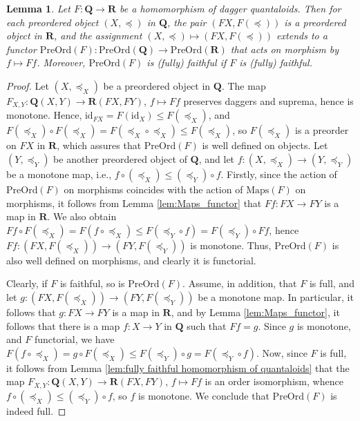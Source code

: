 \documentclass[12pt]{tac}
\newtheorem{lemma}[theorem]{Lemma}
\theoremstyle{definition}
\theoremstyle{remark}
\newcommand{\qo}{{\boldsymbol{\preccurlyeq}}}
\newcommand{\<}{\langle}
\renewcommand{\>}{\rangle}
\renewcommand{\:}{\colon}
\newcommand{\id}{\mathrm{id}}
\begin{document}
\begin{lemma}\label{lem:PreOrd_functor}
 Let $F:\mathbf Q\to \mathbf R$ be a homomorphism of dagger quantaloids.  Then for each preordered object $(X,\qo)$ in $\mathbf Q$, the pair $(FX,F(\qo))$ is a preordered object in $\mathbf R$, and the assignment $(X,\qo)\mapsto (FX,F(\qo))$ extends to a functor $\mathrm{PreOrd}(F):\mathrm{PreOrd}(\mathbf Q)\to\mathrm{PreOrd}(\mathbf R)$ that acts on morphism  by $f\mapsto Ff$.
 Moreover, $\mathrm{PreOrd}(F)$ is (fully) faithful if $F$ is (fully) faithful.
\end{lemma}
\begin{proof}
    Let $(X,\qo_X)$ be a preordered object in $\mathbf Q$. The map $F_{X,Y}:\mathbf Q(X,Y)\to\mathbf R(FX,FY)$, $f\mapsto Ff$ preserves daggers and suprema, hence is monotone. Hence, $\id_{FX}=F(\id_X)\leq F(\qo_X)$, and $F(\qo_X)\circ F(\qo_X)=F(\qo_X\circ\qo_X)\leq F(\qo_X)$, so $F(\qo_X)$ is a preorder on $FX$ in $\mathbf R$, which assures that $\mathrm{PreOrd}(F)$ is well defined on objects. Let $(Y,\qo_Y)$ be another preordered object of $\mathbf Q$, and let $f:(X,\qo_X)\to(Y,\qo_Y)$ be a monotone map, i.e., $f\circ (\qo_X)\leq(\qo_Y)\circ f$. Firstly, since the action of $\mathrm{PreOrd}(F)$ on morphisms coincides with the action of $\mathrm{Maps}(F)$ on morphisms, it follows from Lemma \ref{lem:Maps_functor} that $Ff:FX\to FY$ is a map in $\mathbf R$. We also obtain $Ff\circ F(\qo_X)=F(f\circ \qo_X)\leq F(\qo_Y\circ f)=F(\qo_Y)\circ Ff$, hence $Ff:(FX,F(\qo_X))\to (FY,F(\qo_Y))$ is monotone. Thus, $\mathrm{PreOrd}(F)$ is also well defined on morphisms, and clearly it is functorial. 
    
    Clearly, if $F$ is faithful, so is $\mathrm{PreOrd}(F)$. Assume, in addition, that $F$ is full, and let $g:(FX,F(\qo_X))\to (FY,F(\qo_Y))$ be a monotone map. In particular, it follows that $g:FX\to FY$ is a map in $\mathbf R$, and by Lemma \ref{lem:Maps_functor}, it follows that there is a map $f:X\to Y$ in $\mathbf Q$ such that $Ff=g$. Since $g$ is monotone, and $F$ functorial, we have $F(f\circ \qo_X)=g\circ F(\qo_X)\leq F(\qo_Y)\circ g=F(\qo_Y\circ f)$. Now, since $F$ is full, it follows from Lemma \ref{lem:fully faithful homomorphism of quantaloids} that the map $F_{X,Y}:\mathbf Q(X,Y)\to\mathbf R(FX,FY)$, $f\mapsto Ff$ is an order isomorphism, whence $f\circ (\qo_X)\leq (\qo_Y)\circ f$, so $f$ is monotone. We conclude that $\mathrm{PreOrd}(F)$ is indeed full.
\end{proof}
\end{document}
